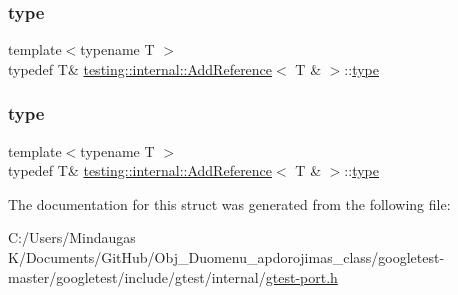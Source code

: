 \mbox{\label{structtesting_1_1internal_1_1_add_reference_3_01_t_01_6_01_4_a93c064cdcdaced0abd167258425e57af}} 
\subsubsection{\texorpdfstring{type}{type}\hspace{0.1cm}{\footnotesize\ttfamily [2/3]}}
{\footnotesize\ttfamily template$<$typename T $>$ \\
typedef T\& \mbox{\hyperlink{structtesting_1_1internal_1_1_add_reference}{testing\+::internal\+::\+Add\+Reference}}$<$ T \& $>$\+::\mbox{\hyperlink{structtesting_1_1internal_1_1_add_reference_3_01_t_01_6_01_4_a93c064cdcdaced0abd167258425e57af}{type}}}

\mbox{\label{structtesting_1_1internal_1_1_add_reference_3_01_t_01_6_01_4_a93c064cdcdaced0abd167258425e57af}} 
\subsubsection{\texorpdfstring{type}{type}\hspace{0.1cm}{\footnotesize\ttfamily [3/3]}}
{\footnotesize\ttfamily template$<$typename T $>$ \\
typedef T\& \mbox{\hyperlink{structtesting_1_1internal_1_1_add_reference}{testing\+::internal\+::\+Add\+Reference}}$<$ T \& $>$\+::\mbox{\hyperlink{structtesting_1_1internal_1_1_add_reference_3_01_t_01_6_01_4_a93c064cdcdaced0abd167258425e57af}{type}}}



The documentation for this struct was generated from the following file\+:\begin{DoxyCompactItemize}
\item 
C\+:/\+Users/\+Mindaugas K/\+Documents/\+Git\+Hub/\+Obj\+\_\+\+Duomenu\+\_\+apdorojimas\+\_\+class/googletest-\/master/googletest/include/gtest/internal/\mbox{\hyperlink{googletest-master_2googletest_2include_2gtest_2internal_2gtest-port_8h}{gtest-\/port.\+h}}\end{DoxyCompactItemize}

